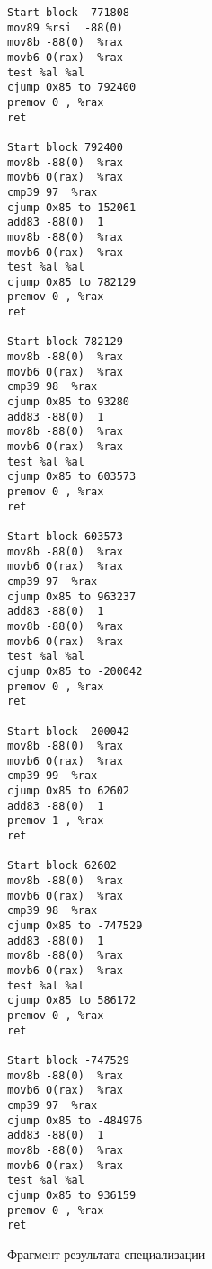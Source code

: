 \begin{figure}
\begin{multicols}{2}
\begin{lstlisting}
Start block -771808
mov89 %rsi  -88(0) 
mov8b -88(0)  %rax 
movb6 0(rax)  %rax 
test %al %al
cjump 0x85 to 792400
premov 0 , %rax 
ret

Start block 792400
mov8b -88(0)  %rax 
movb6 0(rax)  %rax 
cmp39 97  %rax 
cjump 0x85 to 152061
add83 -88(0)  1
mov8b -88(0)  %rax 
movb6 0(rax)  %rax 
test %al %al
cjump 0x85 to 782129
premov 0 , %rax 
ret

Start block 782129
mov8b -88(0)  %rax 
movb6 0(rax)  %rax 
cmp39 98  %rax 
cjump 0x85 to 93280
add83 -88(0)  1
mov8b -88(0)  %rax 
movb6 0(rax)  %rax 
test %al %al
cjump 0x85 to 603573
premov 0 , %rax 
ret

Start block 603573
mov8b -88(0)  %rax 
movb6 0(rax)  %rax 
cmp39 97  %rax 
cjump 0x85 to 963237
add83 -88(0)  1
mov8b -88(0)  %rax 
movb6 0(rax)  %rax 
test %al %al
cjump 0x85 to -200042
premov 0 , %rax 
ret

Start block -200042
mov8b -88(0)  %rax 
movb6 0(rax)  %rax 
cmp39 99  %rax 
cjump 0x85 to 62602
add83 -88(0)  1
premov 1 , %rax 
ret

Start block 62602
mov8b -88(0)  %rax 
movb6 0(rax)  %rax 
cmp39 98  %rax 
cjump 0x85 to -747529
add83 -88(0)  1
mov8b -88(0)  %rax 
movb6 0(rax)  %rax 
test %al %al
cjump 0x85 to 586172
premov 0 , %rax 
ret

Start block -747529
mov8b -88(0)  %rax 
movb6 0(rax)  %rax 
cmp39 97  %rax 
cjump 0x85 to -484976
add83 -88(0)  1
mov8b -88(0)  %rax 
movb6 0(rax)  %rax 
test %al %al
cjump 0x85 to 936159
premov 0 , %rax 
ret
\end{lstlisting}
\end{multicols}
\caption{ Фрагмент результата специализации}
\label{fig:speckmp}
\end{figure}


